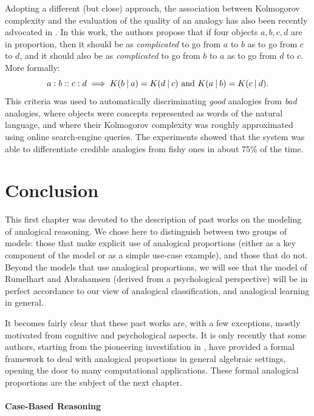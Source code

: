 Adopting a different (but close) approach, the association between Kolmogorov
complexity and the evaluation of the quality of an analogy has also been
recently advocated in \cite{BayPraRic12}. In this work, the authors propose
that if four objects $a, b, c, d$ are in proportion, then it should be as
\textit{complicated} to go from $a$ to $b$ as to go from $c$ to $d$, and it
should also be as \textit{complicated} to go from $b$ to $a$ as to go from $d$
to $c$. More formally:
$$a:b::c:d \implies K(b \:\vert\: a) = K(d \:\vert\: c) \text{ and } K(a \:\vert\: b) =
K(c \:\vert\: d).$$
This criteria was used to automatically discriminating \textit{good} analogies
from \textit{bad} analogies, where objects were concepts represented as words
of the natural language, and where their Kolmogorov complexity was roughly
approximated using online search-engine queries. The experiments showed that
the system was able to differentiate credible analogies from fishy ones in
about 75\% of the time.

\section*{Conclusion}

This first chapter was devoted to the description of past works on the modeling
of analogical reasoning. We chose here to distinguish between two groups of
models: those that make explicit use of analogical proportions (either as a key
component of the model or as a simple use-case example), and those that do not.
Beyond the models that use analogical proportions, we will see that the model
of Rumelhart and Abrahamsen (derived from a psychological perspective) will be
in perfect accordance to our view of analogical classification, and analogical
learning in general.

It becomes fairly clear that these past works are, with a few exceptions,
mostly motivated from cognitive and psychological aspects. It is only recently
that some authors, starting from the pioneering investifation in \cite{Lep04},
have provided a formal framework to deal with analogical proportions in general
algebraic settings, opening the door to many computational applications. These
formal analogical proportions are the subject of the next chapter.



\newpage
\paragraph{Case-Based Reasoning\\}

